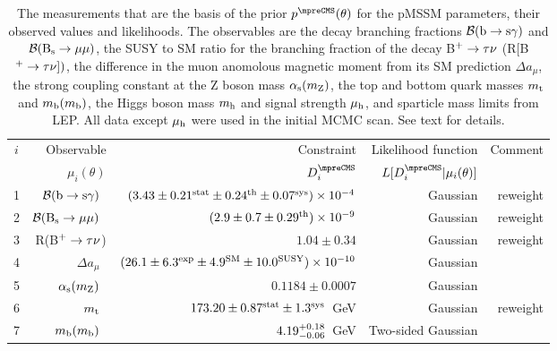 \begin{table}[htb]
\caption{The measurements that are the basis of the \preCMS prior
  $p^\mpreCMS(\theta)$ for the pMSSM parameters, their observed values and likelihoods. The observables are the decay branching fractions ${\cal B}({\rm b} \rightarrow
  {\rm s}\gamma)$ and ${\cal B}({\rm B}_{\rm s} \rightarrow \mu \mu)$,
  the SUSY to SM ratio for the
  branching fraction of the decay B$^{\rm +}\rightarrow \tau \nu$ (R$[$B$^{\rm +}\rightarrow \tau \nu])$,
  the difference in the muon anomolous magnetic moment from its SM
  prediction $\Delta a_\mu$, the strong coupling constant
  at the Z boson mass $\alpha_{\rm s}(m_{\rm Z})$,  the top and bottom quark masses
  $m_{\rm t}$ and $m_{\rm b}(m_{\rm b})$, the Higgs boson mass $m_{\rm h}$ and signal strength $\mu_{\rm h}$, and sparticle mass limits from LEP.  All data except $\mu_{\rm h}$ were used in the initial MCMC scan. See text for details.}
\vspace{1ex}
\begin{center}
\begin{tabular}{c|r|r|r|r}
\hline
$i$     & Observable    & Constraint   & Likelihood function & Comment \\
        & $\mu_i(\theta)$  & $D^\mpreCMS_i$  &  $L[D^\mpreCMS_i|\mu_i(\theta)]$ & \\
\hline\hline
1 & ${\cal B}({\rm b} \rightarrow {\rm s}\gamma)$~\cite{Amhis:2014hma} & $(3.43 \pm 0.21^{\rm
  stat} \pm 0.24^{\rm th} \pm 0.07^{\rm sys})\times 10^{\rm -4}$ & Gaussian & reweight \\
\hline
2 & ${\cal B}({\rm B}_{\rm s} \rightarrow \mu \mu)$~\cite{CMS:2014xfa} & $(2.9 \pm
0.7 \pm 0.29^{\rm th})\times 10^{-9}$ & Gaussian & reweight \\
\hline
3 & R(B$^{\rm +}\rightarrow \tau \nu$)\cite{Amhis:2014hma} & $1.04\pm 0.34$ & Gaussian & reweight \\
\hline
4 & $\Delta a_\mu$~\cite{Hagiwara:2011af} & $(26.1 \pm 6.3^{\rm
  exp}\pm 4.9^{\rm SM} \pm 10.0^{\rm SUSY})\times 10^{\rm -10}$ & Gaussian & \\
\hline
5 & $\alpha_{\rm s}(m_{\rm Z})$~\cite{Agashe:2014kda} & $0.1184 \pm 0.0007$ & Gaussian & \\
\hline
6 & $m_{\rm t}$~\cite{CDF:2013jga} & $173.20\pm0.87^{\rm stat}\pm1.3^{\rm sys}$~GeV & Gaussian & reweight \\
\hline
7 & $m_{\rm b}(m_{\rm b})$~\cite{Agashe:2014kda} & $4.19^{\rm +0.18}_{\rm -0.06}$~GeV & Two-sided Gaussian & \\

\end{tabular}
\end{center}
\end{table}

